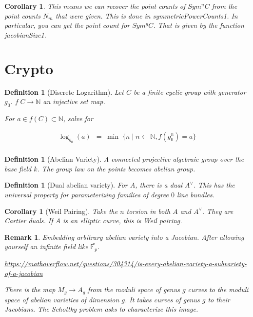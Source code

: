 \documentclass[11pt]{article}
\theoremstyle{change}
\newtheorem{definition}[equation]{Definition}
\newtheorem{cor}[equation]{Corollary}
\newtheorem{remark}[equation]{Remark}
\theoremstyle{nonumberplain}
\numberwithin{equation}{section}
\newcommand\setof[1]{\{ #1 \}}
\begin{document}
\begin{cor}
This means we can recover the point counts of $Sym^n C$ from the point counts $N_m$ that were given. This is done in symmetricPowerCounts1. In particular, you can get the point count for $Sym^g C$. That is given by the function jacobianSize1.
\end{cor}

\section{Crypto}

\begin{definition}[Discrete Logarithm]
Let $C$ be a finite cyclic group with generator $g_0$. $f \; C \to \mathbb{N}$ an injective set map.

For $a \in f(C) \subset \mathbb{N}$, solve for

\begin{eqnarray*}
\log_{g_0} (a) &=& \text{min} \; \;  \setof { n \mid n \leftarrow \mathbb{N} , f (g_0^n) = a }\\
\end{eqnarray*}

\end{definition}

\begin{definition}[Abelian Variety]
A connected projective algebraic group over the base field $k$. The group law on the points becomes abelian group.
\end{definition}

\begin{definition}[Dual abelian variety]
For $A$, there is a dual $A^\vee$. This has the universal property for parameterizing families of degree $0$ line bundles.
\end{definition}

\begin{cor}[Weil Pairing]
Take the $n$ torsion in both $A$ and $A^\vee$. They are Cartier duals. If $A$ is an elliptic curve, this is Weil pairing.
\end{cor}

\begin{remark}
Embedding arbitrary abelian variety into a Jacobian. After allowing yourself an infinite field like $\bar{\mathbb{F}_p}$.

\url{https://mathoverflow.net/questions/304314/is-every-abelian-variety-a-subvariety-of-a-jacobian}

There is the map $M_g \to A_g$ from the moduli space of genus $g$ curves to the moduli space of abelian varieties of dimension $g$. It takes curves of genus $g$ to their Jacobians. The Schottky problem asks to characterize this image.
\end{remark}
\end{document}
